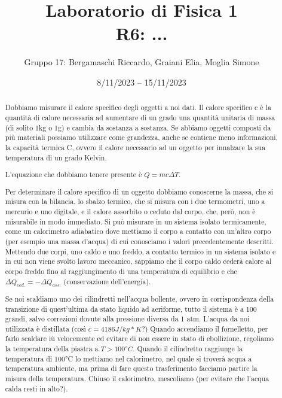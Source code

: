 \documentclass{article}
\title{
    Laboratorio di Fisica 1\\
    R6: ...
}
\author{Gruppo 17: Bergamaschi Riccardo, Graiani Elia, Moglia Simone}
\date{8/11/2023 – 15/11/2023}
\begin{document}
\maketitle

\begin{abstract}
    Dobbiamo misurare il calore specifico degli oggetti a noi dati. Il calore
    specifico c è la quantità di calore necessaria ad aumentare di un grado una
    quantità unitaria di massa (di solito 1kg o 1g) e cambia da sostanza a sostanza.
    Se abbiamo oggetti composti da più materiali possiamo utilizzare come grandezza,
    anche se contiene meno informazioni, la capacità termica C, ovvero il calore
    necessario ad un oggetto per innalzare la sua temperatura di un grado Kelvin.

    L'equazione che dobbiamo tenere presente è $Q=m c \Delta T$.

    Per determinare il calore specifico di un oggetto dobbiamo conoscerne la massa,
    che si misura con la bilancia, lo sbalzo termico, che si misura con i due
    termometri, uno a mercurio e uno digitale, e il calore assorbito o ceduto dal
    corpo, che, però, non è misurabile in modo immediato.
    Si può misurare in un sistema isolato termicamente, come un calorimetro adiabatico
    dove mettiamo il corpo a contatto con un'altro corpo (per esempio una massa
    d'acqua) di cui conosciamo i valori precedentemente descritti.
    Mettendo due corpi, uno caldo e uno freddo, a contatto termico in un sistema
    isolato e in cui non viene svolto lavoro meccanico, sappiamo che il corpo caldo
    cederà calore al corpo freddo fino al raggiungimento di una temperatura di
    equilibrio e che $\Delta Q_{ced.}=-\Delta Q_{ass.}$ (conservazione dell'energia).

    Se noi scaldiamo uno dei cilindretti nell'acqua bollente, ovvero in corrispondenza
    della transizione di quest'ultima da stato liquido ad aeriforme, tutto il sistema
    è a 100 grandi, salvo correzioni dovute alla pressione diversa da 1 atm.
    L'acqua da noi utilizzata è distillata (così $c=4186 J/kg*K$?)
    Quando accendiamo il fornelletto, per farlo scaldare iù velocemente ed evitare di
    non essere in stato di ebollizione, regoliamo la temperatura della piastra a 
    $T>100°C$. 
    Quando il cilindretto raggiunge la temperatura di 100°C lo mettiamo nel calorimetro,
    nel quale si troverà acqua a temperatura ambiente, ma prima di fare questo
    trasferimento facciamo partire la misura della temperatura. Chiuso il calorimetro,
    mescoliamo (per evitare che l'acqua calda resti in alto?).


\end{abstract}
\end{document}
